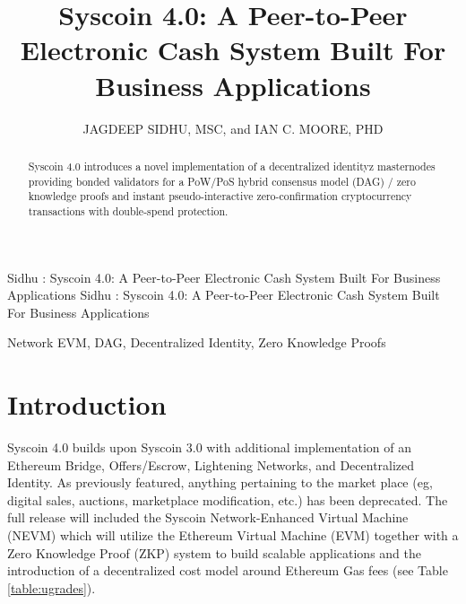 \documentclass[peerreview]{ieeesyscoin}
\begin{document}
\linenumbers
\history{}

\title{\centering Syscoin 4.0: A Peer-to-Peer Electronic Cash System Built For Business Applications}
\author{\centering  \uppercase{Jagdeep Sidhu, MSc}, 
and \uppercase{Ian C. Moore, PhD}}

\address[1]{\centering Syscoin Core Developer, Blockchain Foundry Inc.(e-mail: jsidhu@blockchainfoundry.co)}
\address[2]{\centering  (e-mail: ic3moore@gmail.com)}
\tfootnote{}

\markboth
{Sidhu \headeretal: Syscoin 4.0: A Peer-to-Peer Electronic Cash System Built For Business Applications}
{Sidhu \headeretal: Syscoin 4.0: A Peer-to-Peer Electronic Cash System Built For Business Applications}

\corresp{}

\begin{abstract}
Syscoin 4.0 introduces a novel implementation of a decentralized identityz masternodes providing bonded validators for a PoW/PoS hybrid consensus model (DAG) / zero knowledge proofs and instant pseudo-interactive zero-confirmation cryptocurrency transactions with double-spend protection.
\end{abstract}

\begin{keywords}
Network EVM, DAG, Decentralized Identity, Zero Knowledge Proofs
\end{keywords}

\titlepgskip=-15pt

\maketitle

\section{Introduction}
\label{sec:introduction}

Syscoin 4.0 builds upon Syscoin 3.0 with additional implementation of an Ethereum Bridge, Offers/Escrow, Lightening Networks, and Decentralized Identity. As previously featured, anything pertaining to the market place (eg, digital sales, auctions, marketplace modification, etc.) has been deprecated. The full release will included the Syscoin Network-Enhanced Virtual Machine (NEVM) which will utilize the Ethereum Virtual Machine (EVM) together with a Zero Knowledge Proof (ZKP) system to build scalable applications and the introduction of a decentralized cost model around Ethereum Gas fees (see Table \ref{table:ugrades}).
\end{document}
